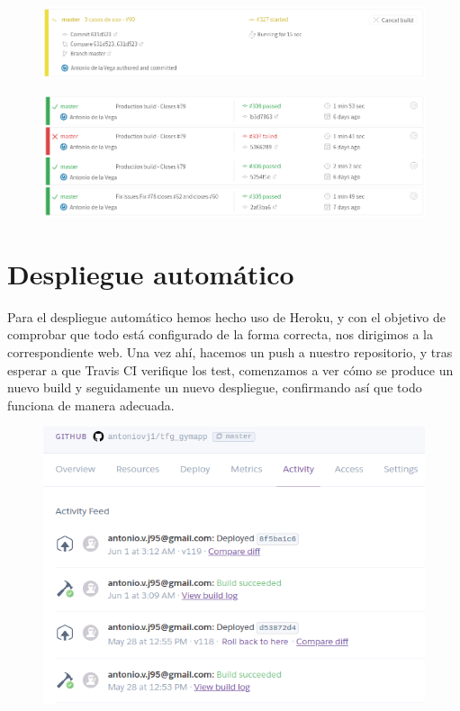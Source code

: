 \begin{figure}
  \begin{center}
    \includegraphics[width=\textwidth]{imagenes/init_travis.png}
    \caption{}
    \label{fig:}
  \end{center}
\end{figure}
\begin{figure}
  \begin{center}
    \includegraphics[width=\textwidth]{imagenes/travis.png}
    \caption{}
    \label{fig:}
  \end{center}
\end{figure}


\section {Despliegue automático}
Para el despliegue automático hemos hecho uso de Heroku, y con el objetivo de comprobar que todo está configurado de la forma correcta, nos dirigimos a la correspondiente web. Una vez ahí, hacemos un push a nuestro repositorio, y tras esperar a que Travis CI verifique los test, comenzamos a ver cómo se produce un nuevo build y seguidamente un nuevo despliegue, confirmando así que todo funciona de manera adecuada.


\begin{figure}
  \begin{center}
    \includegraphics[width=\textwidth]{imagenes/heroku.png}
    \caption{}
    \label{fig:}
  \end{center}
\end{figure}

